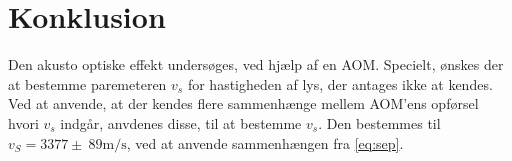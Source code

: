 \documentclass[main]{subfiles}
\begin{document}
\section{Konklusion}
Den akusto optiske effekt undersøges, ved hjælp af en AOM. Specielt, ønskes der at bestemme paremeteren $v_s$ for hastigheden af lys, der antages ikke at kendes. Ved at anvende, at der kendes flere sammenhænge mellem AOM'ens opførsel hvori $v_s$ indgår, anvdenes disse, til at bestemme $v_s$. Den bestemmes til  $v_S = 3377 \pm \ 89 \si{\meter\per\second}$, ved at anvende sammenhængen fra \cref{eq:sep}. 
\end{document}
